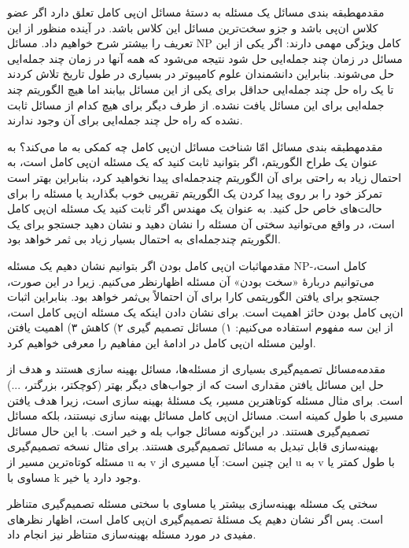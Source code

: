 \begin{itemframe-s}{مقدمه}{طبقه بندی مسائل}
\itm
یک مسئله به دستهٔ مسائل ان‌پی کامل
تعلق دارد اگر عضو کلاس ان‌پی باشد و جزو سخت‌ترین مسائل این کلاس باشد. در آینده منظور از این تعریف را بیشتر شرح خواهیم داد.
\itm
مسائل NP کامل ویژگی مهمی دارند: اگر یکی از این مسائل در زمان چند جمله‌ایی حل شود نتیجه می‌شود که همه آنها در زمان چند جمله‌ایی حل می‌شوند.
 \itm
بنابراین دانشمندان علوم کامپیوتر در بسیاری در طول تاریخ تلاش کردند تا یک راه حل چند جمله‌ایی حداقل برای یکی از این مسائل بیابند اما هیچ الگوریتم چند جمله‌ایی برای این مسائل یافت نشده.
 \itm
از طرف دیگر برای هیچ کدام از مسائل ثابت نشده که راه حل چند جمله‌ایی برای آن وجود ندارند.
\end{itemframe-s}


\begin{itemframe-s}{مقدمه}{طبقه بندی مسائل}
\itm
امّا شناخت مسائل ان‌پی کامل چه کمکی به ما می‌کند؟
\itm
به عنوان یک طراح الگوریتم، اگر بتوانید ثابت کنید که یک مسئله ان‌پی کامل است، به احتمال زیاد به راحتی برای آن الگوریتم چندجمله‌ای پیدا نخواهید کرد، بنابراین بهتر است تمرکز خود را بر روی پیدا کردن یک الگوریتم تقریبی خوب بگذارید یا مسئله را برای حالت‌های خاص حل کنید.
\itm
به عنوان یک مهندس اگر ثابت کنید یک مسئله ان‌پی کامل است، در واقع می‌توانید سختی آن مسئله را نشان دهید و نشان دهید جستجو برای یک الگوریتم چندجمله‌ای به احتمال بسیار زیاد بی ثمر خواهد بود.
\end{itemframe-s}


\begin{itemframe-s}{مقدمه}{اثبات ان‌پی کامل بودن}
\itm
اگر بتوانیم نشان دهیم یک مسئله NP-کامل است، می‌توانیم دربارهٔ «سخت بودن» آن مسئله اظهارنظر می‌کنیم. زیرا در این صورت، جستجو برای یافتن الگوریتمی کارا برای آن احتمالاً بی‌ثمر خواهد بود.
\itm
بنابراین اثبات ان‌پی کامل بودن حائز اهمیت است. برای نشان دادن اینکه یک مسئله ان‌پی کامل است، از این سه مفهوم استفاده می‌کنیم: ۱) مسائل تصمیم گیری ۲) کاهش ۳) اهمیت یافتن اولین مسئله ان‌پی کامل
\itm
در ادامهٔ این مفاهیم را معرفی خواهیم کرد.
\end{itemframe-s}


\begin{itemframe-s}{مقدمه‌}{مسائل تصمیم‌گیری}
\itm
بسیاری از مسئله‌ها، مسائل بهینه سازی
هستند و هدف از حل این مسائل یافتن مقداری است که از جواب‌های دیگر بهتر (کوچکتر، بزرگتر، ...) است. برای مثال مسئله کوتاهترین مسیر، یک مسئلهٔ بهینه سازی است، زیرا هدف یافتن مسیری با طول کمینه است.
\itm
مسائل ان‌پی کامل مسائل بهینه سازی نیستند، بلکه مسائل تصمیم‌گیری
هستند. در این‌گونه مسائل جواب بله و خیر است.
\itm
با این حال مسائل بهینه‌سازی قابل تبدیل به مسائل تصمیم‌گیری هستند. برای مثال نسخه تصمیم‌گیری مسئله کوتاه‌ترین مسیر از u به v این چنین است: آیا مسیری از u به v با طول کمتر یا مساوی با k وجود دارد یا خیر.

\itm
سختی یک مسئله بهینه‌سازی بیشتر یا مساوی با سختی مسئله تصمیم‌گیری متناظر است. پس اگر نشان دهیم یک مسئلهٔ تصمیم‌گیری ان‌پی کامل است، اظهار نظرهای مفیدی در مورد مسئله بهینه‌سازی متناظر نیز انجام داد.
\end{itemframe-s}


